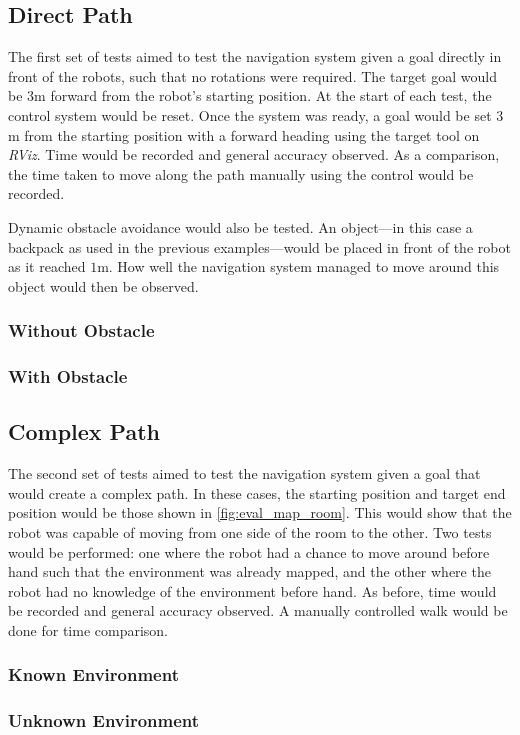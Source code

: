 \subsection{Direct Path}

The first set of tests aimed to test the navigation system given a goal directly in front of the robots, such that no rotations were required. The target goal would be $3$m forward from the robot's starting position. At the start of each test, the control system would be reset. Once the system was ready, a goal would be set $3$m from the starting position with a forward heading using the target tool on \emph{RViz}. Time would be recorded and general accuracy observed. As a comparison, the time taken to move along the path manually using the control would be recorded. 

Dynamic obstacle avoidance would also be tested. An object---in this case a backpack as used in the previous examples---would be placed in front of the robot as it reached $1$m. How well the navigation system managed to move around this object would then be observed.

\subsubsection{Without Obstacle}

\subsubsection{With Obstacle}

\subsection{Complex Path}

The second set of tests aimed to test the navigation system given a goal that would create a complex path. In these cases, the starting position and target end position would be those shown in \autoref{fig:eval_map_room}. This would show that the robot was capable of moving from one side of the room to the other. Two tests would be performed: one where the robot had a chance to move around before hand such that the environment was already mapped, and the other where the robot had no knowledge of the environment before hand. As before, time would be recorded and general accuracy observed. A manually controlled walk would be done for time comparison.

\subsubsection{Known Environment}

\subsubsection{Unknown Environment}

